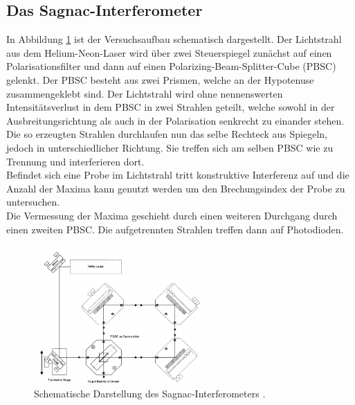 \subsection{Das Sagnac-Interferometer}
\label{sec:SI}
In Abbildung \ref{fig:Aufbau} ist der Versuchsaufbau schematisch dargestellt. Der
Lichtstrahl aus dem Helium-Neon-Laser wird über zwei Steuerspiegel zunächst auf einen Polarisationsfilter
und dann auf einen Polarizing-Beam-Splitter-Cube (PBSC) gelenkt. Der PBSC besteht aus zwei Prismen, welche
an der Hypotenuse zusammengeklebt sind. Der Lichtstrahl wird ohne nennenswerten Intensitätsverlust
in dem PBSC in zwei Strahlen geteilt,
welche sowohl in der Ausbreitungsrichtung als auch in der Polarisation senkrecht zu einander stehen. Die
so erzeugten Strahlen durchlaufen nun das selbe Rechteck aus Spiegeln, jedoch in unterschiedlicher Richtung.
Sie treffen sich am selben PBSC wie zu Trennung und interferieren dort.\\
Befindet sich eine Probe im Lichtstrahl tritt konstruktive Interferenz auf und die Anzahl der Maxima
kann genutzt werden um den Brechungsindex der Probe zu untersuchen.\\
Die Vermessung der Maxima geschieht durch einen weiteren Durchgang durch einen zweiten PBSC.
Die aufgetrennten Strahlen treffen dann auf Photodioden.
\begin{figure}[H]
  \centering
  \includegraphics[width=0.6\textwidth]{pics/Aufbau.png}
  \caption{Schematische Darstellung des Sagnac-Interferometers \cite{Anleitung}.}
  \label{fig:Aufbau}
\end{figure}
